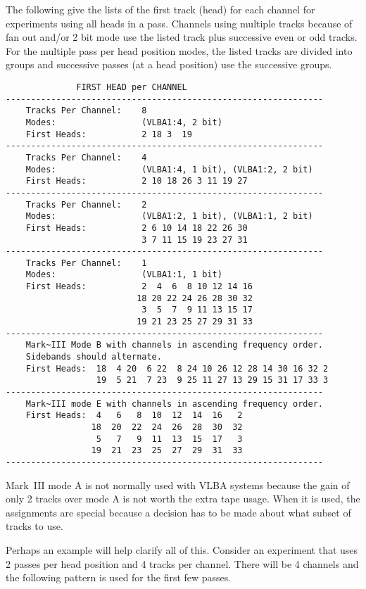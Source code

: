 \documentclass{report}
\begin{document}
The following give the lists of the first track (head) for each
channel for experiments using all heads in a pass.  Channels using
multiple tracks because of fan out and/or 2 bit mode use the listed
track plus successive even or odd tracks.  For the multiple pass per
head position modes, the listed tracks are divided into groups and
successive passes (at a head position) use the successive groups.

\begin{verbatim}
              FIRST HEAD per CHANNEL
---------------------------------------------------------------
    Tracks Per Channel:    8
    Modes:                 (VLBA1:4, 2 bit)
    First Heads:           2 18 3  19
---------------------------------------------------------------
    Tracks Per Channel:    4
    Modes:                 (VLBA1:4, 1 bit), (VLBA1:2, 2 bit)
    First Heads:           2 10 18 26 3 11 19 27
---------------------------------------------------------------
    Tracks Per Channel:    2
    Modes:                 (VLBA1:2, 1 bit), (VLBA1:1, 2 bit)
    First Heads:           2 6 10 14 18 22 26 30
                           3 7 11 15 19 23 27 31
---------------------------------------------------------------
    Tracks Per Channel:    1
    Modes:                 (VLBA1:1, 1 bit)
    First Heads:           2  4  6  8 10 12 14 16
                          18 20 22 24 26 28 30 32
                           3  5  7  9 11 13 15 17
                          19 21 23 25 27 29 31 33
---------------------------------------------------------------
    Mark~III Mode B with channels in ascending frequency order.
    Sidebands should alternate.
    First Heads:  18  4 20  6 22  8 24 10 26 12 28 14 30 16 32 2
                  19  5 21  7 23  9 25 11 27 13 29 15 31 17 33 3
---------------------------------------------------------------
    Mark~III mode E with channels in ascending frequency order.
    First Heads:  4   6   8  10  12  14  16   2
                 18  20  22  24  26  28  30  32
                  5   7   9  11  13  15  17   3
                 19  21  23  25  27  29  31  33
---------------------------------------------------------------
\end{verbatim}

    Mark~III mode A is not normally used with VLBA systems because
the gain of only 2 tracks over mode A is not worth the extra
tape usage.  When it is used, the assignments are special because
a decision has to be made about what subset of tracks to use.

Perhaps an example will help clarify all of this.  Consider an
experiment that uses 2 passes per head position and 4 tracks per
channel.  There will be 4 channels and the following pattern is used
for the first few passes.
\end{document}
